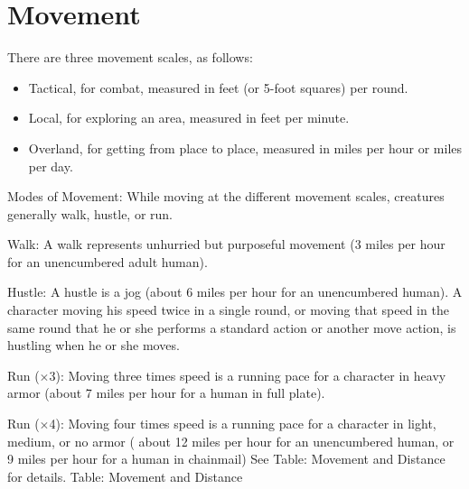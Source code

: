 \section{Movement}

				
There are three movement scales, as follows:
				\begin{itemize}\item  Tactical, for combat, measured in feet (or 5-foot squares) per round.
				\item  Local, for exploring an area, measured in feet per minute.
				\item  Overland, for getting from place to place, measured in miles per hour or miles per day.
\end{itemize}
				
Modes of Movement: While moving at the different movement scales, creatures generally walk, hustle, or run.
				
Walk: A walk represents unhurried but purposeful movement (3 miles per hour for an unencumbered adult human).
				
Hustle: A hustle is a jog (about 6 miles per hour for an unencumbered human). A character moving his speed twice in a single round, or moving that speed in the same round that he or she performs a standard action or another move action, is hustling when he or she moves.
				
Run (\mbox{$\times$}3): Moving three times speed is a running pace for a character in heavy armor (about 7 miles per hour for a human in full plate).
				
Run (\mbox{$\times$}4): Moving four times speed is a running pace for a character in light, medium, or no armor ( about 12 miles per hour for an unencumbered human, or 9 miles per hour for a human in chainmail) See Table: Movement and Distance for details.
				Table: Movement and Distance

